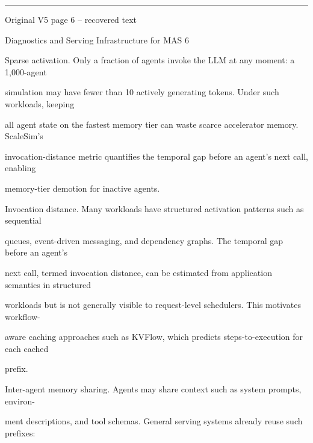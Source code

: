 \par\smallskip\noindent\rule{\textwidth}{0.4pt}\par{\sffamily\footnotesize Original V5 page 6 -- recovered text}\par\begin{flushleft}\footnotesize\ttfamily
\par\smallskip
\par\smallskip
\noindent Diagnostics and Serving Infrastructure for MAS 6\par
\par\smallskip
\par\smallskip
\par\smallskip
\noindent Sparse activation. Only a fraction of agents invoke the LLM at any moment: a 1,000-agent\par
\noindent simulation may have fewer than 10 actively generating tokens. Under such workloads, keeping\par
\noindent all agent state on the fastest memory tier can waste scarce accelerator memory. ScaleSim’s\par
\noindent invocation-distance metric quantifies the temporal gap before an agent’s next call, enabling\par
\noindent memory-tier demotion for inactive agents.\par
\par\smallskip
\noindent Invocation distance. Many workloads have structured activation patterns such as sequential\par
\noindent queues, event-driven messaging, and dependency graphs. The temporal gap before an agent’s\par
\noindent next call, termed invocation distance, can be estimated from application semantics in structured\par
\noindent workloads but is not generally visible to request-level schedulers. This motivates workflow-\par
\noindent aware caching approaches such as KVFlow, which predicts steps-to-execution for each cached\par
\noindent prefix.\par
\par\smallskip
\noindent Inter-agent memory sharing. Agents may share context such as system prompts, environ-\par
\noindent ment descriptions, and tool schemas. General serving systems already reuse such prefixes:\par

\end{flushleft}
